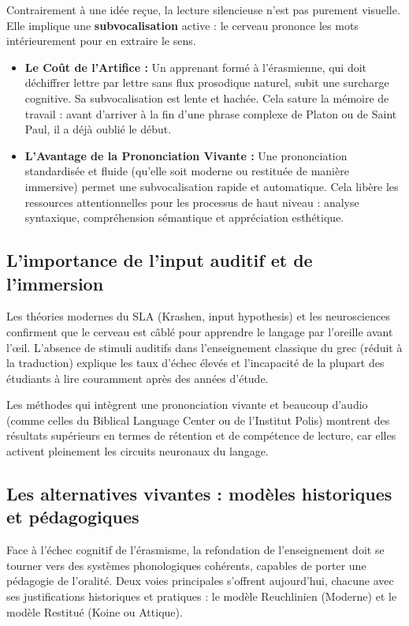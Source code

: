 Contrairement à une idée reçue, la lecture silencieuse n'est pas purement visuelle. Elle implique
une \textbf{subvocalisation} active : le cerveau \og prononce\fg{} les mots intérieurement pour en
extraire le sens.\cite{ref22}

\begin{itemize}\item \textbf{Le Coût de l'Artifice :} Un apprenant formé à l'érasmienne, qui doit déchiffrer lettre par lettre sans flux prosodique naturel, subit une surcharge cognitive. Sa subvocalisation est lente et hachée. Cela sature la mémoire de travail : avant d'arriver à la fin d'une phrase complexe de Platon ou de Saint Paul, il a déjà oublié le début.\cite{ref24}\item \textbf{L'Avantage de la Prononciation Vivante :} Une prononciation standardisée et fluide (qu'elle soit moderne ou restituée de manière immersive) permet une subvocalisation rapide et automatique. Cela libère les ressources attentionnelles pour les processus de haut niveau : analyse syntaxique, compréhension sémantique et appréciation esthétique.\cite{ref25}\end{itemize}

\subsection{L'importance de l'input auditif et de l'immersion}

Les théories modernes du SLA (Krashen, input hypothesis) et les neurosciences confirment que le
cerveau est câblé pour apprendre le langage par l'oreille avant l'œil. L'absence de stimuli auditifs
dans l'enseignement classique du grec (réduit à la traduction) explique les taux d'échec élevés et
l'incapacité de la plupart des étudiants à lire couramment après des années d'étude.\cite{ref26}

Les méthodes qui intègrent une prononciation vivante et beaucoup d'audio (comme celles du Biblical
Language Center ou de l'Institut Polis) montrent des résultats supérieurs en termes de rétention et
de compétence de lecture, car elles activent pleinement les circuits neuronaux du
langage.\cite{ref28}



\subsection{Les alternatives vivantes : modèles historiques et pédagogiques}

Face à l'échec cognitif de l'érasmisme, la refondation de l'enseignement doit se tourner vers des
systèmes phonologiques cohérents, capables de porter une pédagogie de l'oralité. Deux voies
principales s'offrent aujourd'hui, chacune avec ses justifications historiques et pratiques : le
modèle Reuchlinien (Moderne) et le modèle Restitué (Koine ou Attique).



